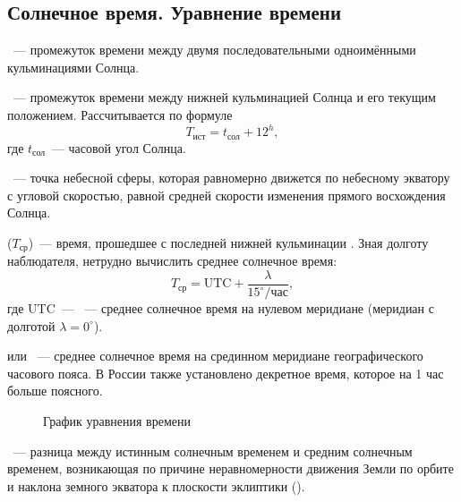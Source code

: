 \subsection{Солнечное время. Уравнение времени}

~--- промежуток времени между двумя последовательными одноимёнными кульминациями Солнца.

~--- промежуток времени между нижней кульминацией Солнца и его текущим положением. Рассчитывается по формуле
\begin{equation}
    T_{\text{ист}} = t_{\text{сол}}+12^h,
\end{equation}
где $t_{\text{сол}}$~--- часовой угол Солнца.

~--- точка небесной сферы, которая равномерно движется по небесному экватору с угловой скоростью, равной средней скорости изменения прямого восхождения Солнца.

 ($T_\text{ср}$)~--- время, прошедшее с последней нижней кульминации . Зная долготу наблюдателя, нетрудно вычислить среднее солнечное время:
\begin{equation*}
    T_\text{ср} = \text{UTC} + \frac{\lambda}{15^\circ/\text{час}},
\end{equation*}
где UTC~--- ~--- среднее солнечное время на нулевом меридиане (меридиан с долготой $\lambda = 0^\circ$).

 или ~--- среднее солнечное время на срединном меридиане географического часового пояса. В России также установлено декретное время, которое на 1 час больше поясного.

\begin{wrapfigure}[12]{r}{0.55\tw}
    \centering
    \vspace{-0.7pc}
    \caption{График уравнения времени}
    \label{pic:time-eq}
\end{wrapfigure}
~--- разница между истинным солнечным временем и средним солнечным временем, возникающая по причине неравномерности движения Земли по орбите и наклона земного экватора к плоскости эклиптики ().

